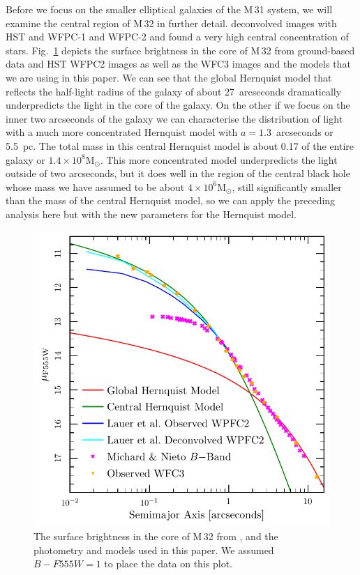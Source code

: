 \documentclass[useAMS,usenatbib]{mn2e}
\newcommand{\msun}{\mathrm{M}_\odot}
\begin{document}
Before we focus on the smaller elliptical galaxies of the M\,31
system, we will examine the central region of M\,32 in further detail.
\citet{1998AJ....116.2263L} deconvolved images with HST and WFPC-1 and
WFPC-2 and found a very high central concentration of stars.
Fig.~\ref{fig:M32-iso} depicts the surface brightness in the core of
M\,32 from ground-based data \citep{1991A&A...243L..17M} and HST WFPC2
images \citep{1998AJ....116.2263L} as well as the WFC3 images and the
models that we are using in this paper.  We can see that the global
Hernquist model that reflects the half-light radius of the galaxy of
about 27~arcseconds dramatically underpredicts the light in the core
of the galaxy.  On the other if we focus on the inner two arcseconds
of the galaxy we can characterise the distribution of light with a
much more concentrated Hernquist model with $a=1.3$~arcseconds or
5.5~pc.  The total mass in this central Hernquist model is about 0.17
of the entire galaxy or $1.4\times 10^8\msun$.  This more concentrated
model underpredicts the light outside of two arcseconds, but it does
well in the region of the central black hole whose mass we have
assumed to be about $4\times 10^6\msun$, still significantly smaller
than the mass of the central Hernquist model, so we can apply the
preceding analysis here but with the new parameters for the Hernquist
model.
\begin{figure}
  \includegraphics[width=\columnwidth]{iso}
  \caption{The surface brightness in the core of M\,32 from
    \citet{1998AJ....116.2263L}, \citet{1991A&A...243L..17M}
    and the photometry and models used in this paper.  We assumed
    $B-F555W=1$ to place the \citet{1991A&A...243L..17M} data
    on this plot.}
  \label{fig:M32-iso}
\end{figure}
\end{document}
